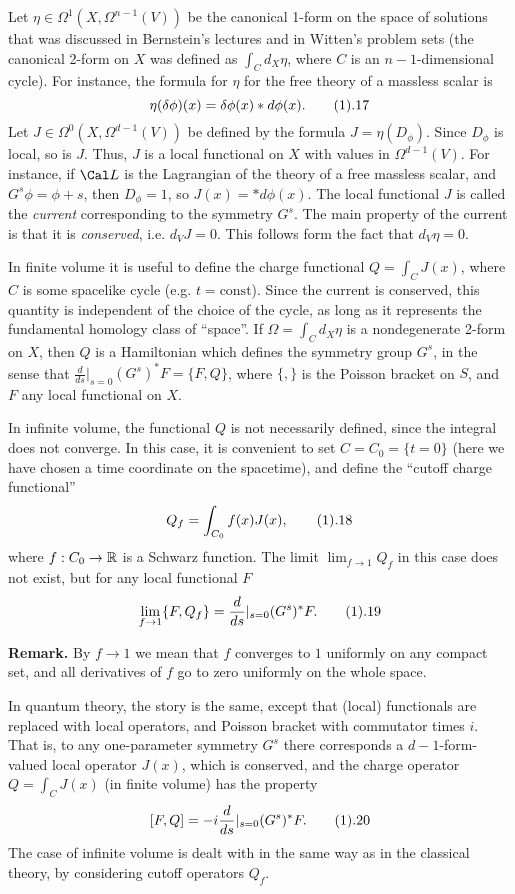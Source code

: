 Let $\eta\in \Omega^1(X,\Omega^{n-1}(V))$ be the canonical
1-form on the space of solutions that was discussed in Bernstein's 
lectures and in  
Witten's problem sets
(the canonical 2-form on $X$ was defined as
$\int_Cd_X\eta$, where $C$ is an $n-1$-dimensional cycle).
For instance, the formula for $\eta$ for the free theory of a massless scalar
is
$$
\eta(\delta\phi)(x)=\delta\phi(x)*d\phi(x).\tag 1.17
$$
Let $J\in \Omega^0(X,\Omega^{d-1}(V))$ be defined by the formula
$J=\eta(D_\phi)$. Since $D_\phi$ is local, so is $J$. 
Thus, $J$ is a local functional on $X$ with values 
in $\Omega^{d-1}(V)$. For instance, if $\Cal L$ is the Lagrangian of the 
theory of a free massless scalar, and $G^s\phi=\phi+s$, then 
$D_\phi=1$, so $J(x)=*d\phi(x)$. The local functional $J$ is called the 
{\it current} corresponding to the symmetry $G^s$. The main property of
the current is that it is {\it conserved}, i.e. $d_VJ=0$. 
This follows form the fact that $d_V\eta=0$. 

In finite volume 
it is useful to define the charge functional
$Q=\int_CJ(x)$, where $C$ is some spacelike cycle (e.g. $t=\text{const}$).
Since the current is conserved, this quantity is independent of the choice
of the cycle, as long as it represents the fundamental homology class of 
``space''. If $\Omega=\int_Cd_X\eta$ is a
nondegenerate 2-form on $X$, then $Q$ 
is a Hamiltonian which defines the 
symmetry group $G^s$, in the sense that
$\frac{d}{ds}|_{s=0}(G^s)^*F=\{F,Q\}$, where $\{,\}$ is the Poisson bracket
on $S$, and $F$ any local functional on $X$.

In infinite volume, the functional $Q$ is not necessarily 
defined, since the integral
does not converge.  
In this case, it is convenient to set $C=C_0=\{t=0\}$ 
(here we have chosen a time coordinate on the spacetime), 
and define the ``cutoff charge functional''
$$
Q_f=\int_{C_0}f(x)J(x),\tag 1.18
$$
where $f: C_0\to \Bbb R$ is a Schwarz function.
The limit $\lim_{f\to 1}Q_f$ in this case does not exist, but for any 
local functional $F$ 
$$
\lim_{f\to 1}\{F,Q_f\}=\frac{d}{ds}|_{s=0}(G^s)^*F.\tag 1.19
$$
  
{\bf Remark.} By $f\to 1$ we mean that $f$ converges to $1$ uniformly on any 
compact set, and all derivatives of $f$ go to zero uniformly on the 
whole space. 

In quantum theory, the story is the same, except that (local) functionals
are replaced with local operators, and Poisson bracket with commutator
times $i$. 
That is, to any one-parameter symmetry $G^s$ there corresponds 
a $d-1$-form-valued local operator $J(x)$, which is conserved, 
and the charge operator $Q=\int_CJ(x)$ (in finite volume) has the property
$$
[F,Q]=-i\frac{d}{ds}|_{s=0}(G^s)^*F.\tag 1.20
$$
The case of infinite volume is dealt with in the same way as 
in the classical theory, by considering cutoff operators $Q_f$. 

